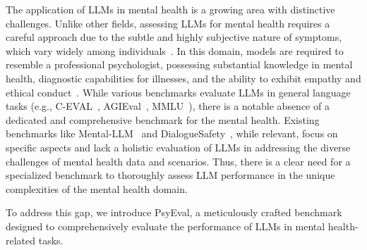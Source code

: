The application of LLMs in mental health is a growing area with distinctive challenges. Unlike other fields, assessing LLMs for mental health requires a careful approach due to the subtle and highly subjective nature of symptoms, which vary widely among individuals~\citep{taschereau2022putting}.
In this domain, models are required to resemble a professional psychologist, possessing substantial knowledge in mental health, diagnostic capabilities for illnesses, and the ability to exhibit empathy and ethical conduct~\citep{iaap_iupsys_2016}.
While various benchmarks evaluate LLMs in general language tasks (e.g., C-EVAL~\citep{huang2023ceval}, AGIEval~\citep{zhong2023agieval}, MMLU~\citep{hendrycks2021measuring}), there is a notable absence of a dedicated and comprehensive benchmark for the mental health. Existing benchmarks like Mental-LLM~\citep{xu2023leveraging} and DialogueSafety~\citep{qiu2023benchmark}, while relevant, focus on specific aspects and lack a holistic evaluation of LLMs in addressing the diverse challenges of mental health data and scenarios. Thus, there is a clear need for a specialized benchmark to thoroughly assess LLM performance in the unique complexities of the mental health domain. %

To address this gap, we introduce PsyEval, a meticulously crafted benchmark designed to comprehensively evaluate the performance of LLMs in mental health-related tasks. 

